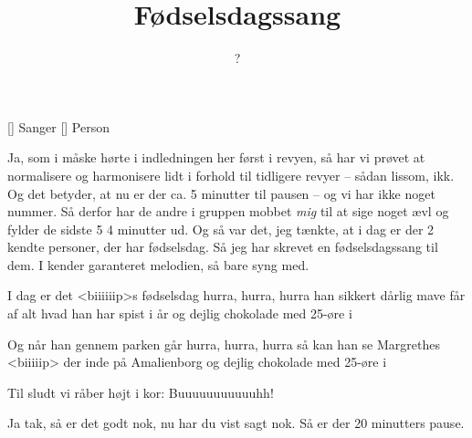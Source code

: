 \documentclass[a4paper,11pt]{article}
\title{Fødselsdagssang}
\author{?}
\begin{document}
\maketitle

\begin{roles}
[] Sanger
[] Person
\end{roles}

\begin{sketch}
     Ja, som i måske hørte i indledningen her først i revyen, så har vi prøvet at normalisere og harmonisere lidt i forhold til tidligere revyer -- sådan lissom, ikk. Og det betyder, at nu er der ca. 5 minutter til pausen -- og vi har ikke noget nummer. Så derfor har de andre i gruppen mobbet \emph{mig} til at sige noget ævl og fylder de sidste 5  4 minutter ud. Og så var det, jeg tænkte, at i dag er der 2 kendte personer, der har fødselsdag. Så jeg har skrevet en fødselsdagssang til dem. I kender garanteret melodien, så bare syng med.

\begin{song}
     I dag er det <biiiiiip>s fødselsdag
              hurra, hurra, hurra
              han sikkert dårlig mave får
              af alt hvad han har spist i år
              og dejlig chokolade med 25-øre i

     Og når han gennem parken går
              hurra, hurra, hurra
              så kan han se Margrethes <biiiiip>
              der inde på Amalienborg
              og dejlig chokolade med 25-øre i

     Til sludt vi råber højt i kor:
              Buuuuuuuuuuuhh!
\end{song}

 Ja tak, så er det godt nok, nu har du vist sagt nok. Så er der 20 minutters pause.
\end{sketch}
\end{document}

